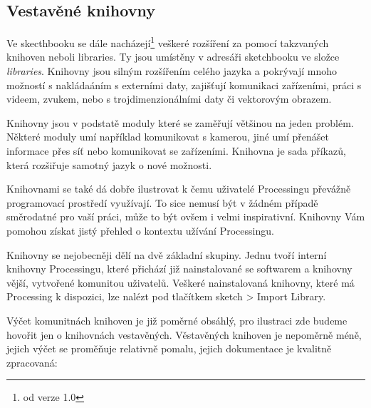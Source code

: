 \documentclass[10pt,twopage]{book}
\newcommand{\pododdil}[1]{\subsection{#1}\label{subsec:#1}}
\begin{document}
\pododdil{Vestavěné knihovny}

Ve skecthbooku se dále nacházejí\footnote{od verze 1.0} veškeré rozšíření za pomocí takzvaných knihoven neboli libraries. Ty jsou umístěny v adresáři sketchbooku ve složce {\em libraries}. Knihovny jsou silným rozšířením celého jazyka a pokrývají mnoho možností s nakládaáním s externími daty, zajišťují komunikaci zařízeními, práci s videem, zvukem, nebo s trojdimenzionálními daty či vektorovým obrazem.


Knihovny jsou v podstatě moduly které se zaměřují většinou na jeden problém. Některé moduly umí například komunikovat s kamerou, jiné umí přenášet informace přes síť nebo komunikovat se zařízeními. Knihovna je sada příkazů, která rozšiřuje samotný jazyk o nové možnosti.


Knihovnami se také dá dobře ilustrovat k čemu uživatelé Processingu převážně programovací prostředí využívají. To sice nemusí být v žádném případě směrodatné pro vaší práci, může to být ovšem i velmi inspirativní. Knihovny Vám pomohou získat jistý přehled o kontextu užívání Processingu.

Knihovny se  nejobecněji dělí na dvě základní skupiny. Jednu tvoří interní knihovny Processingu, které přichází již nainstalované se softwarem a knihovny vější, vytvořené komunitou uživatelů. Veškeré nainstalovaná knihovny, které má Processing k dispozici, lze nalézt pod tlačítkem sketch > Import Library.


Výčet komunitnách knihoven je již poměrné obsáhlý, pro ilustraci zde budeme hovořit jen o knihovnách vestavěných. Věstavěných knihoven je nepoměrně méně, jejich výčet se proměňuje relativně pomalu, jejich dokumentace je kvalitně zpracovaná:
\end{document}
